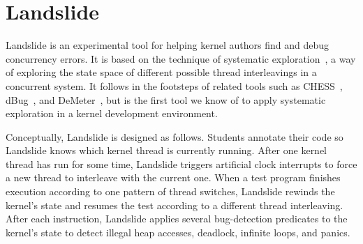 \newcommand\hilight[2]{\color{#1}#2\color{black}}

\section{Landslide}
\label{sec:landslide}

Landslide is an experimental tool for helping kernel authors find and debug concurrency errors.
It is based on the technique of systematic exploration~\cite{verisoft}, a way of exploring the state space of different possible thread interleavings in a concurrent system.
It follows in the footsteps of related tools such as CHESS~\cite{chess}, dBug~\cite{dbug-ssv}, and DeMeter~\cite{demeter}, but is the first tool we know of to apply systematic exploration in a kernel development environment.

Conceptually,
Landslide is designed as follows.
Students annotate their code so Landslide knows
which kernel thread is currently running.
After one kernel thread has run for some time,
Landslide triggers artificial clock interrupts
to force a new thread to interleave with the current one.
When a test program finishes execution according
to one pattern of thread switches,
Landslide rewinds the kernel's state
and resumes the test according to a different thread interleaving.
After each instruction,
Landslide applies several bug-detection predicates to
the kernel's state to detect
illegal heap accesses,
deadlock, infinite loops, and panics.

